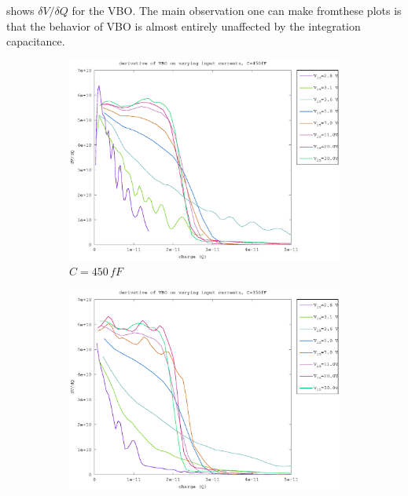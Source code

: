 \documentclass{article}
\begin{document}
 shows $\delta V/\delta Q$ for the VBO. The main observation one can make fromthese plots is that the behavior of VBO is almost entirely unaffected by the integration capacitance.


\begin{figure}[h]
	\centering
	\begin{subfigure}[b]{0.475\textwidth}
	    \centering
	    \includegraphics[width=\textwidth]{fig/vbo_d_slope_450fF.eps}
	    \caption[Network2]%
	    {$C=450\,fF$}    
	    \label{fig:vbo_d_slopes_450fF}
	\end{subfigure}
	\hfill
	\begin{subfigure}[b]{0.475\textwidth}  
	    \centering 
	    \includegraphics[width=\textwidth]{fig/vbo_d_slope_350fF.eps}

\end{subfigure}
\end{figure}
\end{document}
